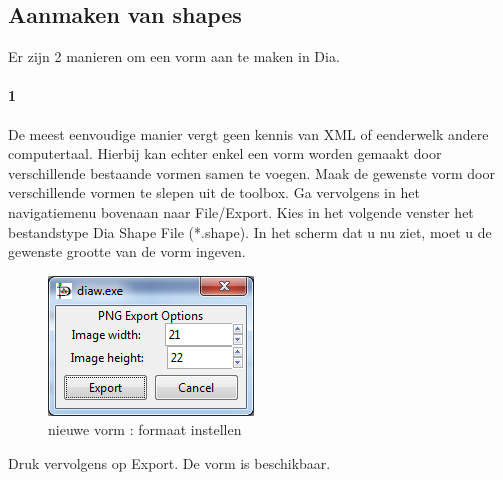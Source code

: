 \documentclass[12pt,a4paper]{report}
\begin{document}
\begin{flushleft}
\subsection{Aanmaken van shapes}
Er zijn 2 manieren om een vorm aan te maken in Dia.
\paragraph*{1}
De meest eenvoudige manier vergt geen kennis van XML of eenderwelk andere computertaal. Hierbij kan echter enkel een vorm worden gemaakt door verschillende bestaande vormen samen te voegen. Maak de gewenste vorm door verschillende vormen te slepen uit de toolbox. Ga vervolgens in het navigatiemenu bovenaan naar File/Export. Kies in het volgende venster het bestandstype Dia Shape File (*.shape). In het scherm dat u nu ziet, moet u de gewenste grootte van de vorm ingeven. 
\begin{figure}[H]
\includegraphics[scale=1]{images/shape_01.png}
\centering
\vspace{-10pt}
\caption{nieuwe vorm : formaat instellen}
\end{figure}
Druk vervolgens op Export. De vorm is beschikbaar.
\pagebreak

\end{flushleft}
\end{document}
